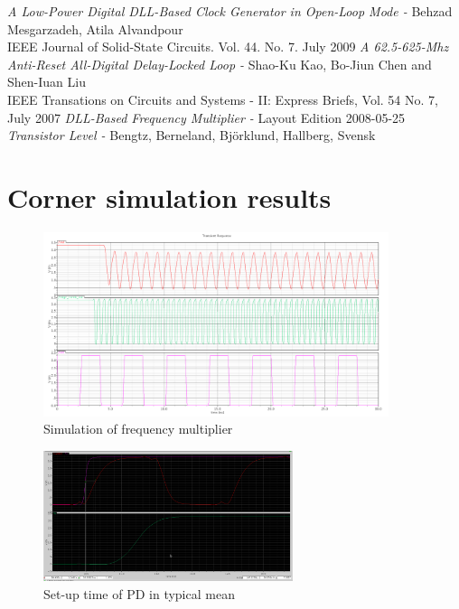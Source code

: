 \documentclass[a4paper,12pt]{article} \usepackage{graphicx}
\begin{document}
\newpage
\appendix 
\newpage

\begin{thebibliography}{99}
        \textit{A Low-Power Digital DLL-Based Clock Generator in Open-Loop Mode - }
                Behzad Mesgarzadeh, Atila Alvandpour \\
                IEEE Journal of Solid-State Circuits. Vol. 44. No. 7. July 2009
        \textit{A 62.5-625-Mhz Anti-Reset All-Digital Delay-Locked Loop - }
                Shao-Ku Kao, Bo-Jiun Chen and Shen-Iuan Liu \\
                IEEE Transations on Circuits and Systems - II: Express Briefs, Vol. 54 No. 7, July 2007
        \textit{DLL-Based Frequency Multiplier - }
                Layout Edition 2008-05-25 \\
        \textit{Transistor Level - }
                Bengtz, Berneland, Björklund, Hallberg, Svensk \\

\end{thebibliography}

\newpage
\section{Corner simulation results}
\label{sec:corners}

\begin{figure}[h]
        \centering
        \includegraphics[width=0.9\textwidth]{../Bilder/freq_mult_layout_sim.png}
        \caption{Simulation of frequency multiplier}
        \label{fig:freq_mult_sim}
\end{figure}

\begin{figure}[h]
  \centering
  \includegraphics[width=0.65\textwidth]{../Bilder/Layout/simulations/pd_tm.png}
  \caption{Set-up time of PD in typical mean}
  \label{fig:PDtm}
\end{figure}
\end{document}
